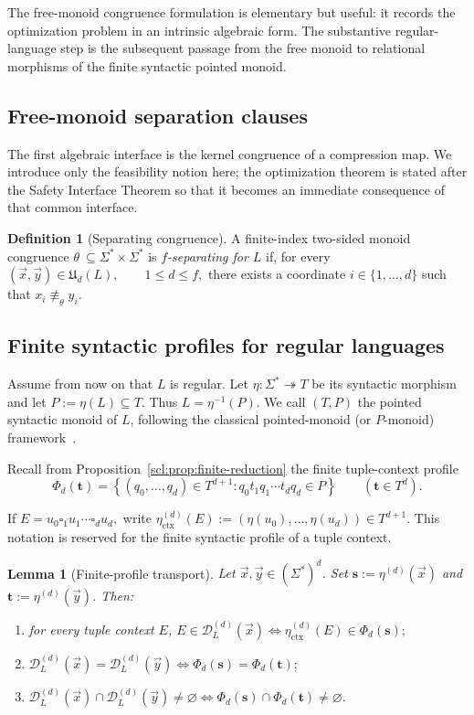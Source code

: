\documentclass[10pt,a4paper]{article}
\newtheorem{lemma}[theorem]{Lemma}
\theoremstyle{definition}
\newtheorem{definition}[theorem]{Definition}
\theoremstyle{remark}
\newcommand{\D}{\mathcal D}
\newcommand{\blank}{\square}
\begin{document}
The free-monoid congruence formulation is elementary but useful: it records
the optimization problem in an intrinsic algebraic form. The substantive
regular-language step is the subsequent passage from the free monoid to
relational morphisms of the finite syntactic pointed monoid.


\subsection{Free-monoid separation clauses}

The first algebraic interface is the kernel congruence of a compression map.
We introduce only the feasibility notion here; the optimization theorem is
stated after the Safety Interface Theorem so that it becomes an immediate
consequence of that common interface.

\begin{definition}[Separating congruence]
A finite-index two-sided monoid congruence
\(
\theta\ \subseteq\Sigma^*\times\Sigma^*
\)
is \emph{\(f\)-separating for \(L\)} if, for every
\(
(\vec x,\vec y)\in\mathfrak U_d(L),
\qquad
1\le d\le f,
\)
there exists a coordinate \(i\in\{1,\ldots,d\}\) such that \(x_i\not\equiv_\theta y_i.\) \end{definition}

\subsection{Finite syntactic profiles for regular languages}

Assume from now on that \(L\) is regular.
Let \(\eta:\Sigma^*\twoheadrightarrow T\) be its syntactic morphism and let
\(P:=\eta(L)\subseteq T\). Thus \(L=\eta^{-1}(P)\).  We call \((T,P)\) the
pointed syntactic monoid of \(L\), following the classical pointed-monoid
(or \(P\)-monoid) framework~\cite{Sakarovitch1979,Pin1981}.

Recall from Proposition~\ref{scl:prop:finite-reduction} the finite tuple-context
profile
\[
\Phi_d(\mathbf t)
=\left\{(q_0,\ldots,q_d)\in T^{d+1}:q_0t_1q_1\cdots t_dq_d\in P\right\}
\qquad(\mathbf t\in T^d).
\]

If
\(E=u_0\blank_1u_1\cdots\blank_du_d,\)
write
\(\eta_{\mathrm{ctx}}^{(d)}(E) := (\eta(u_0),\ldots,\eta(u_d))\in T^{d+1}.\)
This notation is reserved for the finite syntactic profile of a tuple context.
\begin{lemma}[Finite-profile transport]
\label{alg:lem:profile}
Let \(\vec x,\vec y\in(\Sigma^*)^d\).  Set
\(\mathbf s:=\eta^{(d)}(\vec x)\) and \(\mathbf t:=\eta^{(d)}(\vec y)\).
Then:
\begin{enumerate}[label=(\roman*),leftmargin=*]
\item for every tuple context \(E\),
\(E\in\D_L^{(d)}(\vec x) \iff \eta_{\mathrm{ctx}}^{(d)}(E)\in\Phi_d(\mathbf s);\)
\item
\(
\D_L^{(d)}(\vec x)=\D_L^{(d)}(\vec y)
\iff
\Phi_d(\mathbf s)=\Phi_d(\mathbf t);
\)
\item
\(
\D_L^{(d)}(\vec x)\cap\D_L^{(d)}(\vec y)\neq\varnothing
\iff
\Phi_d(\mathbf s)\cap\Phi_d(\mathbf t)\neq\varnothing.
\)
\end{enumerate}
\end{lemma}
\end{document}
